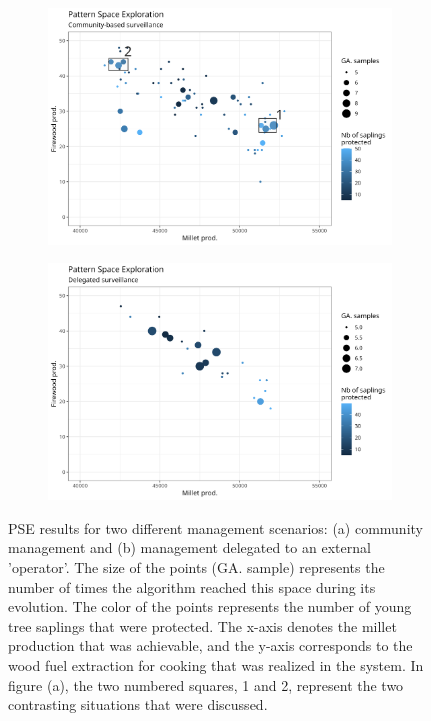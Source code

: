 \documentclass{article}
\begin{document}
    \begin{figure}
        \centering
        \begin{subfigure}[b]{0.85\textwidth}
           \includegraphics[width=1\linewidth]{./img/om_pse_sPop.png}
           \caption{}
           \label{fig:pseSPOP} 
        \end{subfigure}
        
        \begin{subfigure}[b]{0.85\textwidth}
           \includegraphics[width=1\linewidth]{./img/om_pse_sReprez.png}
           \caption{}
           \label{fig:pseSDELEG}
        \end{subfigure}
        
        \caption{PSE results for two different management scenarios: (a) community management and (b) management delegated to an external 'operator'. The size of the points (GA. sample) represents the number of times the algorithm reached this space during its evolution. The color of the points represents the number of young tree saplings that were protected. The x-axis denotes the millet production that was achievable, and the y-axis corresponds to the wood fuel extraction for cooking that was realized in the system. In figure (a), the two numbered squares, 1 and 2, represent the two contrasting situations that were discussed.}\label{fig:PSE}
    \end{figure}
\end{document}
